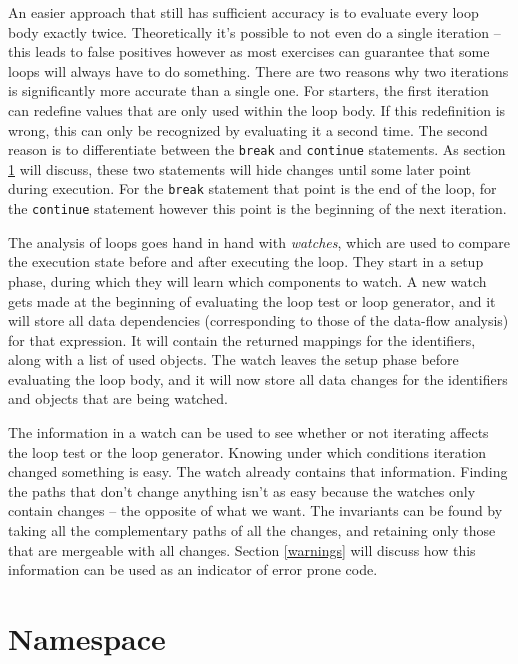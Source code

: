 \documentclass[a4paper, 16pt, oneside]{Thesis}
\begin{document}
An easier approach that still has sufficient accuracy is to evaluate
every loop body exactly twice. Theoretically it's possible to not even
do a single iteration -- this leads to false positives however as most
exercises can guarantee that some loops will always have to do
something. There are two reasons why two iterations is significantly
more accurate than a single one. For starters, the first iteration can
redefine values that are only used within the loop body. If this
redefinition is wrong, this can only be recognized by evaluating it a
second time. The second reason is to differentiate between the
\texttt{break} and \texttt{continue} statements. As section
\ref{namespace} will discuss, these two statements will hide changes
until some later point during execution. For the \texttt{break}
statement that point is the end of the loop, for the \texttt{continue}
statement however this point is the beginning of the next iteration.

The analysis of loops goes hand in hand with \emph{watches}, which are
used to compare the execution state before and after executing the loop.
They start in a setup phase, during which they will learn which
components to watch. A new watch gets made at the beginning of
evaluating the loop test or loop generator, and it will store all data
dependencies (corresponding to those of the data-flow analysis) for that
expression. It will contain the returned mappings for the identifiers,
along with a list of used objects. The watch leaves the setup phase
before evaluating the loop body, and it will now store all data changes
for the identifiers and objects that are being watched.

The information in a watch can be used to see whether or not iterating
affects the loop test or the loop generator. Knowing under which
conditions iteration changed something is easy. The watch already
contains that information. Finding the paths that don't change anything
isn't as easy because the watches only contain changes -- the opposite
of what we want. The invariants can be found by taking all the
complementary paths of all the changes, and retaining only those that
are mergeable with all changes. Section \ref{warnings} will discuss how
this information can be used as an indicator of error prone code.

\section{Namespace}\label{namespace}
\end{document}
